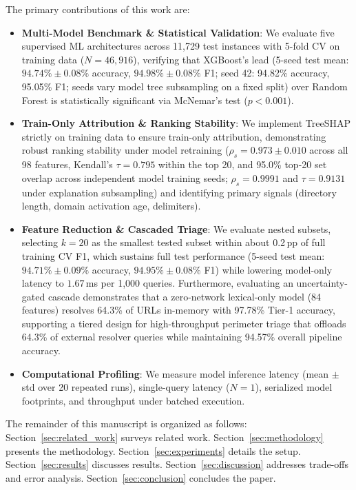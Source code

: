The primary contributions of this work are:
\begin{itemize}
    \item \textbf{Multi-Model Benchmark \& Statistical Validation}: We evaluate five supervised ML architectures across 11,729 test instances with 5-fold CV on training data ($N=46,916$), verifying that XGBoost's lead (5-seed test mean: $94.74\% \pm 0.08\%$ accuracy, $94.98\% \pm 0.08\%$ F1; seed 42: 94.82\% accuracy, 95.05\% F1; seeds vary model tree subsampling on a fixed split) over Random Forest is statistically significant via McNemar's test ($p < 0.001$).
    \item \textbf{Train-Only Attribution \& Ranking Stability}: We implement TreeSHAP strictly on training data to ensure train-only attribution, demonstrating robust ranking stability under model retraining ($\rho_s = 0.973 \pm 0.010$ across all 98 features, Kendall's $\tau = 0.795$ within the top 20, and 95.0\% top-20 set overlap across independent model training seeds; $\rho_s = 0.9991$ and $\tau = 0.9131$ under explanation subsampling) and identifying primary signals (directory length, domain activation age, delimiters).
    \item \textbf{Feature Reduction \& Cascaded Triage}: We evaluate nested subsets, selecting $k=20$ as the smallest tested subset within about 0.2\,pp of full training CV F1, which sustains full test performance (5-seed test mean: $94.71\% \pm 0.09\%$ accuracy, $94.95\% \pm 0.08\%$ F1) while lowering model-only latency to $1.67$\,ms per 1,000 queries. Furthermore, evaluating an uncertainty-gated cascade demonstrates that a zero-network lexical-only model (84 features) resolves 64.3\% of URLs in-memory with 97.78\% Tier-1 accuracy, supporting a tiered design for high-throughput perimeter triage that offloads 64.3\% of external resolver queries while maintaining 94.57\% overall pipeline accuracy.
    \item \textbf{Computational Profiling}: We measure model inference latency (mean $\pm$ std over 20 repeated runs), single-query latency ($N=1$), serialized model footprints, and throughput under batched execution.
\end{itemize}

The remainder of this manuscript is organized as follows: Section~\ref{sec:related_work} surveys related work. Section~\ref{sec:methodology} presents the methodology. Section~\ref{sec:experiments} details the setup. Section~\ref{sec:results} discusses results. Section~\ref{sec:discussion} addresses trade-offs and error analysis. Section~\ref{sec:conclusion} concludes the paper.

